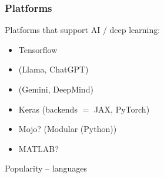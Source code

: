 \begin{frame}
    \frametitle{Platforms}
    
    Platforms that support AI / deep learning:

    \vspace{0.5em}
    \begin{itemize}
        \item Tensorflow
        \vspace{0.5em}
        \item {} (Llama, ChatGPT)
        \vspace{0.5em}
        \item {} (Gemini, DeepMind)
        \vspace{0.5em}
        \item Keras (backends $=$ JAX, PyTorch)
        \vspace{0.5em}
        \item Mojo? (Modular (Python))
        \vspace{0.5em}
        \item MATLAB? 
    \end{itemize}

\end{frame}




\begin{frame}
    
    Popularity -- languages
    
    \begin{figure}
       \begin{center}
       \end{center}
    \end{figure}

\end{frame}


